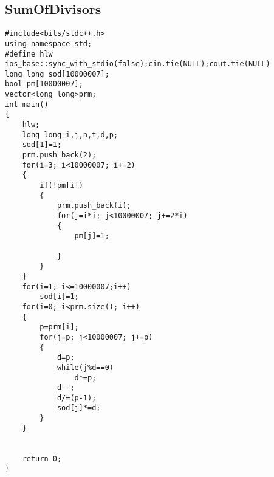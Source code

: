 \documentclass[10pt,a4paper,onesided]{article}
\begin{document}
\begin{multicols*}{3}
\subsection{SumOfDivisors}
\begin{lstlisting}
#include<bits/stdc++.h>
using namespace std;
#define hlw ios_base::sync_with_stdio(false);cin.tie(NULL);cout.tie(NULL)
long long sod[10000007];
bool pm[10000007];
vector<long long>prm;
int main()
{
    hlw;
    long long i,j,n,t,d,p;
    sod[1]=1;
    prm.push_back(2);
    for(i=3; i<10000007; i+=2)
    {
        if(!pm[i])
        {
            prm.push_back(i);
            for(j=i*i; j<10000007; j+=2*i)
            {
                pm[j]=1;

            }
        }
    }
    for(i=1; i<=10000007;i++)
        sod[i]=1;
    for(i=0; i<prm.size(); i++)
    {
        p=prm[i];
        for(j=p; j<10000007; j+=p)
        {
            d=p;
            while(j%d==0)
                d*=p;
            d--;
            d/=(p-1);
            sod[j]*=d;
        }
    }


    return 0;
}
\end{lstlisting}

\end{multicols*}
\end{document}
